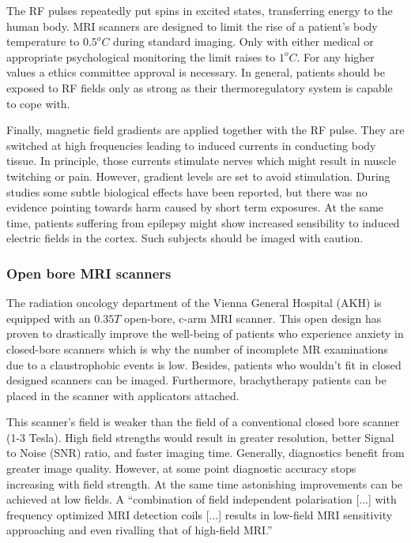 The RF pulses repeatedly put spins in excited states, transferring energy to the human body. MRI scanners are designed to limit the rise of a patient's body temperature to $0.5^oC$ during standard imaging. Only with either medical or appropriate psychological monitoring the limit raises to $1^oC$. For any higher values a ethics committee approval is necessary.
In general, patients should be exposed to RF fields only as strong as their thermoregulatory system is capable to cope with.

Finally, magnetic field gradients are applied together with the RF pulse.
They are switched at high frequencies leading to induced currents in conducting body tissue.
In principle, those currents stimulate nerves which might result in muscle twitching or pain.
However, gradient levels are set to avoid stimulation.
During studies some subtle biological effects have been reported, but there was no evidence pointing towards harm caused by short term exposures.
At the same time, patients suffering from epilepsy might show increased sensibility to induced electric fields in the cortex.
Such subjects should be imaged with caution. \cite{Maidment2014}


\subsubsection{Open bore MRI scanners}
The radiation oncology department of the Vienna General Hospital (AKH) is equipped with an $0.35  T$ open-bore, c-arm MRI scanner.
This open design has proven to drastically improve the well-being of patients who experience anxiety in closed-bore scanners which is why the number of incomplete MR examinations due to a claustrophobic events is low. \cite{Enders2011a, Bangard2007}
Besides, patients who wouldn't fit in closed designed scanners can be imaged.
Furthermore, brachytherapy patients can be placed in the scanner with applicators attached.

This scanner's field is weaker than the field of a conventional closed bore scanner (1-3 Tesla).
High field strengths would result in greater resolution, better Signal to Noise (SNR) ratio, and faster imaging time.
Generally, diagnostics benefit from greater image quality.
However, at some point diagnostic accuracy stops increasing with field strength.
At the same time astonishing improvements can be achieved at low fields.
A ``combination of field independent polarisation [...] with frequency optimized MRI detection coils [...] results in low-field MRI sensitivity approaching and even rivalling that of high-field MRI.'' \cite{Coffey2013}

